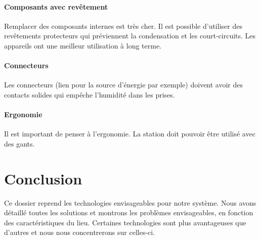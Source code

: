 \paragraph{Composants avec revêtement}

Remplacer des composants internes est très cher. Il est possible d’utiliser des revêtements protecteurs qui préviennent la condensation et les court-circuits. Les appareils ont une meilleur utilisation à long terme.

\paragraph{Connecteurs}

Les connecteurs (lien pour la source d’énergie par exemple) doivent avoir des contacts solides qui empêche l’humidité dans les prises.

\paragraph{Ergonomie}

Il est important de penser à l’ergonomie. La station doit pouvoir être utilisé avec des gants.

\section{Conclusion}

Ce dossier reprend les technologies envisageables pour notre système. Nous avons détaillé toutes les solutions et montrons les problèmes envisageables, en fonction des caractéristiques du lieu. Certaines technologies sont plus avantageuses que d'autres et nous nous concentrerons sur celles-ci.